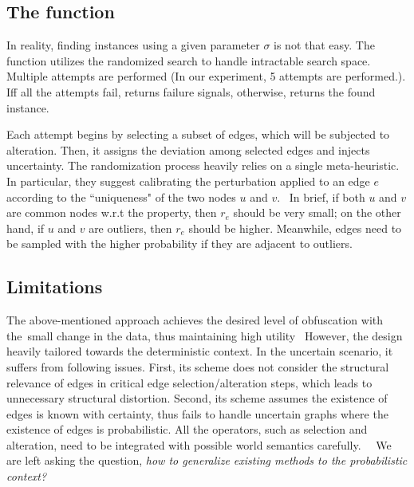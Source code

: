 \subsection{The function {\genobf}}
In reality, finding {\keobf} instances using a given parameter $\sigma$ is not that easy.
The function {\genobf} utilizes the randomized search to handle intractable search space. Multiple attempts are performed (In our experiment, 5 attempts are performed.). Iff all the attempts fail, {\genobf} returns failure signals, otherwise, returns the found {\keobf} instance. 

Each attempt begins by selecting a subset of edges, which will be subjected to alteration. Then, it assigns the deviation among selected edges and injects uncertainty. The randomization process heavily relies on a single meta-heuristic. 
In particular, they suggest calibrating the perturbation applied to an edge $e$ according to the ``uniqueness" of the two nodes $u$ and $v$. 
In brief, if both $u$ and $v$ are common nodes w.r.t the property, then $r_{e}$ should be very small; on the other hand, if $u$ and $v$ are outliers, then $r_{e}$ should be higher. Meanwhile, edges need to be sampled with the higher probability if they are adjacent to outliers. 


\subsection{Limitations} 
The above-mentioned approach achieves the desired level of obfuscation with the small change in the data, thus maintaining high utility 
However, the design heavily tailored towards the deterministic context. In the uncertain scenario, it suffers from following issues. First, its scheme does not consider the structural relevance of edges in critical edge selection/alteration steps, which leads to unnecessary structural distortion. 
Second, its scheme assumes the existence of edges is known with certainty, thus fails to handle uncertain graphs where the existence of edges is probabilistic. All the operators, such as selection and alteration, need to be integrated with possible world semantics carefully.  
We are left asking the question, \emph{how to generalize existing methods to the probabilistic context?}



